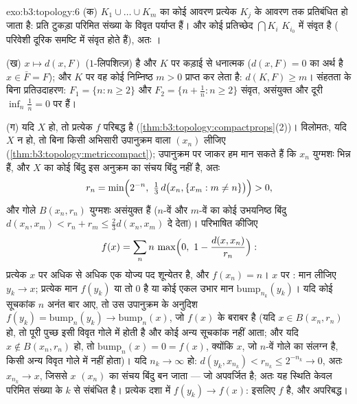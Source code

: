 \begin{solution}{exo:b3:topology:6}
(क) $K_1 \cup \dots \cup K_m$ का कोई आवरण प्रत्येक $K_j$ के आवरण तक प्रतिबंधित हो जाता
है: प्रति टुकड़ा परिमित संख्या के विवृत पर्याप्त हैं। और कोई प्रतिच्छेद
$\bigcap K_i$  $K_{i_0}$ में संवृत है ( परिवेशी दूरिक समष्टि में संवृत
होते हैं), अतः ।

(ख) $x \mapsto d(x, F)$  ($1$-लिपशित्ज़) है और $K$ पर कड़ाई से धनात्मक
($d(x, F) = 0$ का अर्थ है $x \in \bar F =
F$); और  $K$ पर वह कोई निम्निष्ठ $m > 0$
प्राप्त कर लेता है: $d(K, F)
\geq m$। संहतता के बिना प्रतिउदाहरण: $F_1 = \{n : n \geq
2\}$ और
$F_2 = \{n + \frac1n : n \geq 2\}$ संवृत, असंयुक्त और दूरी $\inf_n \frac1n = 0$ पर हैं।

(ग) यदि $X$  हो, तो प्रत्येक  $f$ परिबद्ध है (\cref{thm:b3:topology:compactprops}(2))।
विलोमतः, यदि $X$  न हो, तो बिना किसी अभिसारी उपानुक्रम वाला
$(x_n)$ लीजिए (\cref{thm:b3:topology:metriccompact}); उपानुक्रम पर जाकर हम मान सकते हैं कि $x_n$
युग्मशः भिन्न हैं, और $X$ का कोई बिंदु इस अनुक्रम का संचय बिंदु
नहीं है, अतः
\[
r_n = \min\Bigl(2^{-n},\ \tfrac13\,d\bigl(x_n, \{x_m : m \neq
n\}\bigr)\Bigr) > 0,
\]
और गोले $B(x_n, r_n)$ युग्मशः असंयुक्त हैं ($n$-वें और $m$-वें का कोई
उभयनिष्ठ बिंदु $d(x_n, x_m) < r_n +
r_m \leq \frac23 d(x_n, x_m)$ दे देता)। परिभाषित कीजिए
\[
f(x) = \sum_{n} n\,\max\Bigl(0,\ 1 - \frac{d(x,
x_n)}{r_n}\Bigr):
\]
प्रत्येक $x$ पर अधिक से अधिक एक योज्य पद शून्येतर है, और $f(x_n) = n$।
$x$ पर : मान लीजिए $y_k \to x$; प्रत्येक मान $f(y_k)$ या तो $0$
है या कोई एकल उभार मान $\mathrm{bump}_{n_k}(y_k)$। यदि कोई सूचकांक $n$ अनंत बार आए,
तो उस उपानुक्रम के अनुदिश $f(y_k) = \mathrm{bump}_n(y_k) \to
\mathrm{bump}_n(x)$, जो $f(x)$ के बराबर है (यदि $x \in B(x_n,
r_n)$
हो, तो पूरी पुच्छ इसी विवृत गोले में होती है और कोई अन्य सूचकांक
नहीं आता; और यदि $x \notin B(x_n, r_n)$ हो, तो $\mathrm{bump}_n(x) = 0 = f(x)$, क्योंकि $x$, जो $n$-वें
गोले का संलग्न है, किसी अन्य विवृत गोले में नहीं होता)। यदि $n_k \to \infty$
हो: $d(y_k, x_{n_k}) < r_{n_k} \leq 2^{-n_k} \to 0$, अतः $x_{n_k}
\to x$, जिससे $x$ $(x_n)$ का संचय बिंदु बन जाता ---
जो अपवर्जित है; अतः यह स्थिति केवल परिमित संख्या के $k$ से संबंधित
है। प्रत्येक दशा में $f(y_k) \to f(x)$: इसलिए $f$  है, और अपरिबद्ध।
\end{solution}

